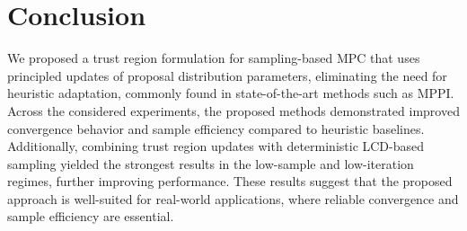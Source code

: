 \section{Conclusion}
\label{sec:conclusion}

We proposed a trust region formulation for sampling-based \ac{MPC} that uses principled updates of proposal distribution parameters, eliminating the need for heuristic adaptation, commonly found in state-of-the-art methods such as \ac{MPPI}.
Across the considered experiments, the proposed methods demonstrated improved convergence behavior and sample efficiency compared to heuristic baselines.
Additionally, combining trust region updates with deterministic \ac{LCD}-based sampling yielded the strongest results in the low-sample and low-iteration regimes, further improving performance.
These results suggest that the proposed approach is well-suited for real-world applications, where reliable convergence and sample efficiency are essential.
